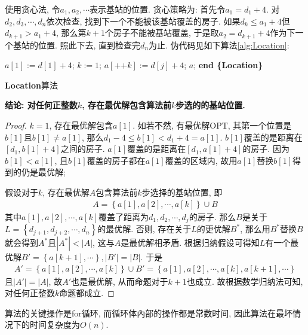 \documentclass{article}
\begin{document}
\solution 使用贪心法, 令$a_1,a_2,\cdots$表示基站的位置. 贪心策略为: 首先令$a_1=d_1+4$. 对$d_2,d_3,\cdots,d_n$依次检查, 找到下一个不能被该基站覆盖的房子. 如果$d_k\leq a_1+4$但$d_{k+1}>a_1+4$, 那么第$k+1$个房子不能被基站覆盖, 于是取$a_2=d_{k+1}+4$作为下一个基站的位置. 照此下去, 直到检查完$d_n$为止. 伪代码见如下算法\ref{alg:Location}:
\begin{algorithm}[H]
    \begin{algorithmic}[1]
    \State $a[1]:=d[1]+4$; $k:=1$;
            \State $a[\text{++}k]:=d[j]+4$;
        \EndIf
    \EndFor
    \State \Return $a$;
    \State \textbf{end \{Location\}}
    \end{algorithmic}
    \caption{\textbf{Location}算法}
    \label{alg:Location}
\end{algorithm}
\textbf{结论: 对任何正整数$k$, 存在最优解包含算法前$k$步选的的基站位置.}
\begin{proof}
    $k=1$, 存在最优解包含$a[1]$. 如若不然, 有最优解OPT, 其第一个位置是$b[1]$且$b[1]\neq a[1]$, 那么$d_1-4\leq b[1] <d_1+4=a[1]$. $b[1]$覆盖的是距离在$[d_1,b[1]+4]$之间的房子. $a[1]$覆盖的是距离在$[d_1,a[1]+4]$的房子. 因为$b[1]<a[1]$, 且$b[1]$覆盖的房子都在$a[1]$覆盖的区域内, 故用$a[1]$替换$b[1]$得到的仍是最优解;

    假设对于$k$, 存在最优解$A$包含算法前$k$步选择的基站位置, 即
    \begin{align}
        A=\left\{ a\left[ 1 \right] ,a\left[ 2 \right] ,\cdots ,a\left[ k \right] \right\} \cup B
    \end{align}
    其中$a[1],a[2],\cdots,a[k]$覆盖了距离为$d_1,d_2,\cdots,d_j$的房子. 那么$B$是关于$L=\left\{ d_{j+1},d_{j+2},\cdots ,d_n \right\} $的最优解. 否则, 存在关于$L$的更优解$B^{\ast}$, 那么用$B^{\ast}$替换$B$就会得到$A^{\ast}$且$\left| A^{\ast} \right|<\left| A \right|$, 这与$A$是最优解相矛盾. 根据归纳假设可得知$L$有一个最优解$B'=\left\{ a\left[ k+1 \right] ,\cdots \right\} ,\left| B' \right|=\left| B \right|$. 于是
    \begin{align}
        A'=\left\{ a\left[ 1 \right] ,a\left[ 2 \right] ,\cdots ,a\left[ k \right] \right\} \cup B'=\left\{ a\left[ 1 \right] ,a\left[ 2 \right] ,\cdots ,a\left[ k \right] ,a\left[ k+1 \right] ,\cdots \right\} 
    \end{align}
    且$\left| A' \right|=\left| A \right|$, 故$A'$也是最优解, 从而命题对于$k+1$也成立. 故根据数学归纳法可知, 对任何正整数$k$命题都成立.
\end{proof}
算法的关键操作是for循环, 而循环体內部的操作都是常数时间, 因此算法在最坏情况下的时间复杂度为$O(n)$.
\end{document}
